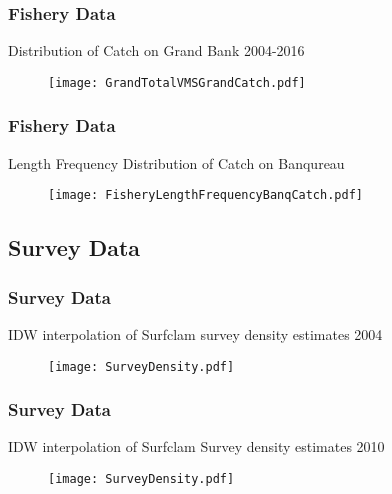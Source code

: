 \documentclass{beamer}
\newcommand{\yr}{2016} %
\begin{document}
\begin{frame}
\frametitle{Fishery Data}
Distribution of Catch on Grand Bank 2004-\yr

\begin{figure}
        \begin{center}
            \texttt{[image: GrandTotalVMSGrandCatch.pdf]}
        \end{center}
    \end{figure}


\end{frame}
\begin{frame}
\frametitle{Fishery Data}
Length Frequency Distribution of Catch on Banqureau

\begin{figure}
        \begin{center}
            \texttt{[image: FisheryLengthFrequencyBanqCatch.pdf]}
        \end{center}
    \end{figure}


\end{frame}

\subsection{Survey Data}
\begin{frame}
\frametitle{Survey Data}
IDW interpolation of Surfclam survey density estimates 2004

\begin{figure}
        \begin{center}
            \texttt{[image: SurveyDensity.pdf]}
        \end{center}
    \end{figure}


\end{frame}


\begin{frame}
\frametitle{Survey Data}
IDW interpolation of Surfclam Survey density estimates 2010

\begin{figure}
        \begin{center}
            \texttt{[image: SurveyDensity.pdf]}
        \end{center}
    \end{figure}


\end{frame}
\end{document}
